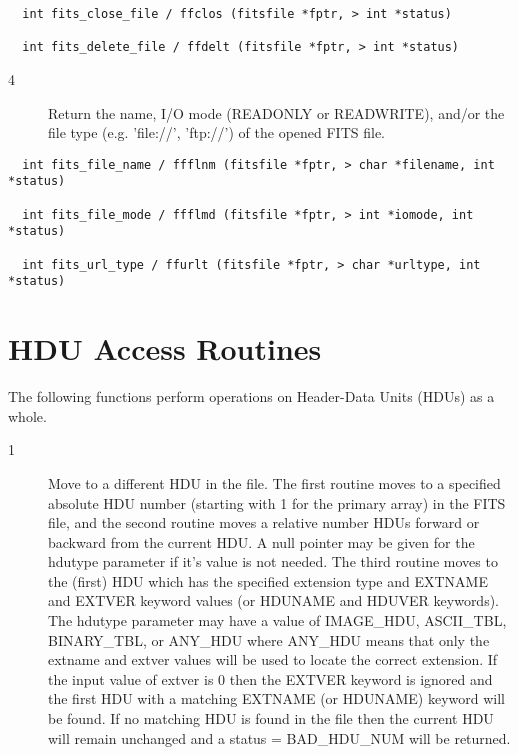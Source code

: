 \documentclass[11pt]{book}
\begin{document}
\begin{verbatim}
  int fits_close_file / ffclos (fitsfile *fptr, > int *status)

  int fits_delete_file / ffdelt (fitsfile *fptr, > int *status)
\end{verbatim}

\begin{description}
\item[4 ]Return the name, I/O mode (READONLY or READWRITE), and/or the file
type (e.g. 'file://', 'ftp://') of the opened FITS file. \label{ffflnm}
 \label{ffflmd} \label{ffurlt}
\end{description}

\begin{verbatim}
  int fits_file_name / ffflnm (fitsfile *fptr, > char *filename, int *status)

  int fits_file_mode / ffflmd (fitsfile *fptr, > int *iomode, int *status)

  int fits_url_type / ffurlt (fitsfile *fptr, > char *urltype, int *status)
\end{verbatim}

\section{HDU Access Routines}

The following functions perform operations on Header-Data Units (HDUs)
as a whole.


\begin{description}
\item[1 ] Move to a different HDU in the file.  The first routine moves to a
    specified absolute HDU number (starting with 1 for the primary
    array) in the FITS file, and the second routine moves a relative
    number HDUs forward or backward from the current HDU.  A null
    pointer may be given for the hdutype parameter if it's value is not
    needed.  The third routine moves to the (first) HDU which has the
    specified extension type and EXTNAME and EXTVER keyword values (or
    HDUNAME and HDUVER keywords).  The hdutype parameter may have a
    value of IMAGE\_HDU, ASCII\_TBL, BINARY\_TBL, or ANY\_HDU where
    ANY\_HDU means that only the extname and extver values will be used
    to locate the correct extension.  If the input value of extver is 0
    then the EXTVER keyword is ignored and the first HDU with a
    matching EXTNAME (or HDUNAME) keyword will be found.  If no
    matching HDU is found in the file then the current HDU will remain
    unchanged and a status = BAD\_HDU\_NUM will be returned.
  \label{ffmahd} \label{ffmrhd} \label{ffmnhd}
\end{description}
\end{document}
